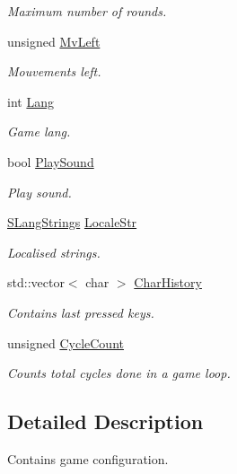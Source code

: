 \begin{DoxyCompactItemize}
\begin{DoxyCompactList}\small\item\em Maximum number of rounds. \end{DoxyCompactList}\item 
unsigned \hyperlink{struct_chase_game_1_1_s_game_status_ae06758bdc7c2bda68801afd314837532}{Mv\-Left}
\begin{DoxyCompactList}\small\item\em Mouvements left. \end{DoxyCompactList}\item 
int \hyperlink{struct_chase_game_1_1_s_game_status_a93c5db2ceb07569075406e865949b4d9}{Lang}
\begin{DoxyCompactList}\small\item\em Game lang. \end{DoxyCompactList}\item 
bool \hyperlink{struct_chase_game_1_1_s_game_status_a62533ff3db4ae14aa98fc94f4105923f}{Play\-Sound}
\begin{DoxyCompactList}\small\item\em Play sound. \end{DoxyCompactList}\item 
\hyperlink{struct_chase_game_1_1_s_lang_strings}{S\-Lang\-Strings} \hyperlink{struct_chase_game_1_1_s_game_status_a697729a081cae30a6b85c5a16a5f9f70}{Locale\-Str}
\begin{DoxyCompactList}\small\item\em Localised strings. \end{DoxyCompactList}\item 
std\-::vector$<$ char $>$ \hyperlink{struct_chase_game_1_1_s_game_status_a9aa8227d792a823032742d456e43b9a8}{Char\-History}
\begin{DoxyCompactList}\small\item\em Contains last pressed keys. \end{DoxyCompactList}\item 
unsigned \hyperlink{struct_chase_game_1_1_s_game_status_a0a306693a394c28318c8015a975e426d}{Cycle\-Count}
\begin{DoxyCompactList}\small\item\em Counts total cycles done in a game loop. \end{DoxyCompactList}\end{DoxyCompactItemize}


\subsection{Detailed Description}
Contains game configuration. 

